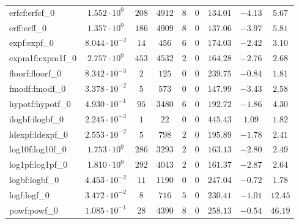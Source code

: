 \begin{tabular}{|l|c|c|c|c|c|c|c|c|}
erfcf:erfcf\_0               & $ 1.552 \cdot 10^{0}  $ & $ 208    $ & $ 4912   $ & $ 8   $ & $ 0   $ & $ 134.01      $ & $ -4.13   $ & $ 5.67    $ \\
erff:erff\_0                 & $ 1.357 \cdot 10^{0}  $ & $ 186    $ & $ 4909   $ & $ 8   $ & $ 0   $ & $ 137.06      $ & $ -3.97   $ & $ 5.81    $ \\
expf:expf\_0                 & $ 8.044 \cdot 10^{-2} $ & $ 14     $ & $ 456    $ & $ 6   $ & $ 0   $ & $ 174.03      $ & $ -2.42   $ & $ 3.10    $ \\
expm1f:expm1f\_0             & $ 2.757 \cdot 10^{0}  $ & $ 453    $ & $ 4532   $ & $ 2   $ & $ 0   $ & $ 164.28      $ & $ -2.76   $ & $ 2.68    $ \\
floorf:floorf\_0             & $ 8.342 \cdot 10^{-3} $ & $ 2      $ & $ 125    $ & $ 0   $ & $ 0   $ & $ 239.75      $ & $ -0.84   $ & $ 1.81    $ \\
fmodf:fmodf\_0               & $ 3.378 \cdot 10^{-2} $ & $ 5      $ & $ 573    $ & $ 0   $ & $ 0   $ & $ 147.99      $ & $ -3.43   $ & $ 2.58    $ \\
hypotf:hypotf\_0             & $ 4.930 \cdot 10^{-1} $ & $ 95     $ & $ 3480   $ & $ 6   $ & $ 0   $ & $ 192.72      $ & $ -1.86   $ & $ 4.30    $ \\
ilogbf:ilogbf\_0             & $ 2.245 \cdot 10^{-3} $ & $ 1      $ & $ 22     $ & $ 0   $ & $ 0   $ & $ 445.43      $ & $ 1.09    $ & $ 1.82    $ \\
ldexpf:ldexpf\_0             & $ 2.553 \cdot 10^{-2} $ & $ 5      $ & $ 798    $ & $ 2   $ & $ 0   $ & $ 195.89      $ & $ -1.78   $ & $ 2.41    $ \\
log10f:log10f\_0             & $ 1.753 \cdot 10^{0}  $ & $ 286    $ & $ 3293   $ & $ 2   $ & $ 0   $ & $ 163.13      $ & $ -2.80   $ & $ 2.49    $ \\
log1pf:log1pf\_0             & $ 1.810 \cdot 10^{0}  $ & $ 292    $ & $ 4043   $ & $ 2   $ & $ 0   $ & $ 161.37      $ & $ -2.87   $ & $ 2.64    $ \\
logbf:logbf\_0               & $ 4.453 \cdot 10^{-2} $ & $ 11     $ & $ 1190   $ & $ 0   $ & $ 0   $ & $ 247.04      $ & $ -0.72   $ & $ 1.78    $ \\
logf:logf\_0                 & $ 3.472 \cdot 10^{-2} $ & $ 8      $ & $ 716    $ & $ 5   $ & $ 0   $ & $ 230.41      $ & $ -1.01   $ & $ 12.45   $ \\
powf:powf\_0                 & $ 1.085 \cdot 10^{-1} $ & $ 28     $ & $ 4390   $ & $ 8   $ & $ 0   $ & $ 258.13      $ & $ -0.54   $ & $ 46.19   $ \\

\end{tabular}
